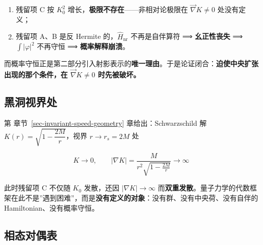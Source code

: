 \documentclass[
  chinese,
  a4paper,
  UTF8,
  12pt,
  oneside,
  openany]{ctexbook}
\providecommand{\tightlist}{%
  \setlength{\itemsep}{0pt}\setlength{\parskip}{0pt}}
\theoremstyle{plain}
\theoremstyle{plain}
\theoremstyle{plain}
\theoremstyle{definition}
\theoremstyle{plain}
\theoremstyle{plain}
\theoremstyle{remark}
\begin{document}
\begin{enumerate}
\def\labelenumi{\arabic{enumi}.}
\tightlist
\item
  残留项 C 按 \(K_0^{2}\) 增长，\textbf{极限不存在}------非相对论极限在
  \(\vec\nabla K\neq0\) 处没有定义；
\item
  残留项 A、B 是反 Hermite 的，\(\hat H_{\text{nr}}\) 不再是自伴算符 ⟹
  \textbf{幺正性丧失} ⟹ \(\int\lvert\varphi\rvert^{2}\) 不再守恒 ⟹
  \textbf{概率解释崩溃}。
\end{enumerate}

而概率守恒正是第二部分引入射影表示的\textbf{唯一理由}。于是论证闭合：\textbf{迫使中央扩张出现的那个条件，在
\(\vec\nabla K\neq0\) 时先被破坏。}

\subsection{黑洞视界处}\label{ux9ed1ux6d1eux89c6ux754cux5904}

第 章节~\ref{sec-invariant-speed-geometry} 章给出：Schwarzschild 解
\(K(r)=\sqrt{1-\dfrac{2M}{r}}\)，视界 \(r\to r_s=2M\) 处

\[
K\to0,\qquad \lvert\nabla K\rvert=\frac{M}{r^{2}\sqrt{1-\frac{2M}{r}}}\to\infty
\]

此时残留项 C 不仅随 \(K_0\) 发散，还因 \(\lvert\nabla K\rvert\to\infty\)
而\textbf{双重发散}。量子力学的代数框架在此不是''遇到困难''，而是\textbf{没有定义的对象}：没有群、没有中央荷、没有自伴的
Hamiltonian、没有概率守恒。

\subsection{相态对偶表}\label{ux76f8ux6001ux5bf9ux5076ux8868}
\end{document}
